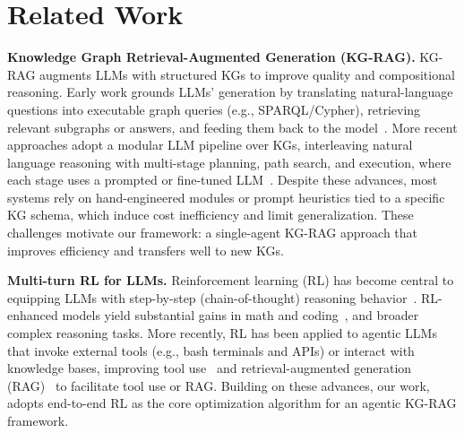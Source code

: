 \section{Related Work}

\noindent\textbf{Knowledge Graph Retrieval-Augmented Generation (KG-RAG).}
KG-RAG augments LLMs with structured KGs to improve quality and compositional reasoning. Early work grounds LLMs' generation by translating natural-language questions into executable graph queries (e.g., SPARQL/Cypher), retrieving relevant subgraphs or answers, and feeding them back to the model~\citep{ouyang2022traininglanguagemodelsfollow, lee2025sparkle}. More recent approaches adopt a modular LLM pipeline over KGs, interleaving natural language reasoning with multi-stage planning, path search, and execution, where each stage uses a prompted or fine-tuned LLM~\citep{Luo2024RoG, Sun2024ToG, Chen2024Pog, Wang2025ReKnoS}. Despite these advances, most systems rely on hand-engineered modules or prompt heuristics tied to a specific KG schema, which induce cost inefficiency and limit generalization. These challenges motivate our \framework{} framework: a single-agent KG-RAG approach that improves efficiency and transfers well to new KGs.

\noindent\textbf{Multi-turn RL for LLMs.}
Reinforcement learning (RL) has become central to equipping LLMs with step-by-step (chain-of-thought) reasoning behavior~\citep{OpenAI2024o1, DeepSeek2025R1}. RL-enhanced models yield substantial gains in math and coding~\citep{le2022coderl,chervonyi2025goldmedal}, and broader complex reasoning tasks.
More recently, RL has been applied to agentic LLMs that invoke external tools (e.g., bash terminals and APIs) or interact with knowledge bases, improving tool use~\citep{Qin2023ToolLLM} and retrieval-augmented generation (RAG)~\citep{jin2025searchr1,wang2025otc} to facilitate tool use or RAG. Building on these advances, our work, \framework{} adopts end-to-end RL as the core optimization algorithm for an agentic KG-RAG framework.


